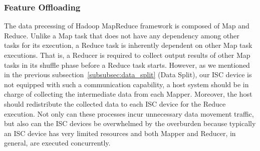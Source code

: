 

\subsubsection{Feature Offloading}\label{subsubsec:feature_offloading}


The data precessing of Hadoop MapReduce framework is composed of Map and Reduce. Unlike a Map task that does not have any dependency among other tasks for its execution, a Reduce task is inherently dependent on other Map task executions. That is, a Reducer is required to collect output results of other Map tasks in its shuffle phase before a Reduce task starts. However, as we mentioned in the previous subsection~\ref{subsubsec:data_split} (Data Split), our ISC device is not equipped with such a communication capability, a host system should be in charge of collecting the intermediate data from each Mapper. Moreover, the host should redistribute the collected data to each ISC device for the Reduce execution. Not only can these processes incur unnecessary data movement traffic, but also can the ISC devices be overwhelmed by the overburden because typically an ISC device has very limited resources and both Mapper and Reducer, in general, are executed concurrently.

